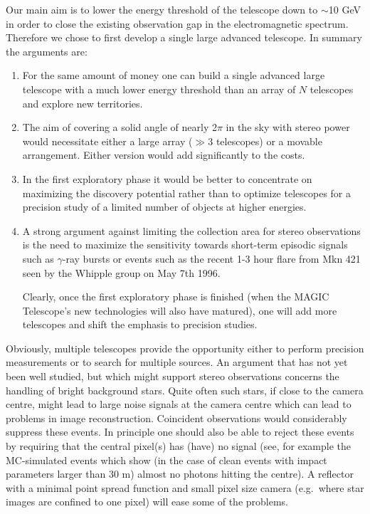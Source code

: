Our main aim is to
lower the energy threshold of the telescope down to $\sim$10 GeV
in order to close the existing observation
gap in the electromagnetic spectrum. Therefore we chose to first develop
a single large advanced telescope.
In summary the arguments are:

\begin{enumerate}
\item  For the same amount of money one can build a single advanced large telescope with a
much lower energy threshold than an array of $N$ telescopes and
explore new territories.

\item  The aim of covering a solid angle of nearly 2$\pi $ in the
sky with stereo
power would necessitate either a large array ($\gg $3 telescopes) or a
movable arrangement. Either version would add significantly to the costs.

\item  In the first exploratory phase it would be better to concentrate on
maximizing the discovery potential rather than to optimize telescopes for a
precision study of a limited number of objects at higher energies.

\item  A strong argument against limiting the collection area for stereo
observations is the need to maximize the sensitivity towards short-term
episodic signals such as $\gamma $-ray bursts or events such as the recent
1-3 hour flare from Mkn 421 seen by the Whipple group on May 7th 1996.

Clearly, once the first exploratory phase is finished (when the MAGIC 
Telescope's new
technologies will also have matured), one will add more telescopes and shift
the emphasis to precision studies.
\end{enumerate}

Obviously, multiple telescopes provide the opportunity either to perform
precision measurements or to search for multiple sources. An argument that
has not yet been well studied, but which might support stereo observations
concerns  the handling of bright background stars. Quite often 
such stars, if close to the camera centre, might lead to
large noise signals at the camera centre which 
can lead to problems 
in image reconstruction.
Coincident observations would
considerably suppress these events. In principle one should also be able to
reject these events by requiring that the central  pixel(s) has (have) no
signal (see, for example the MC-simulated events which show (in the case of 
clean events with impact
parameters larger than 30 m) almost no photons hitting the
centre). A reflector with a minimal point spread function and small pixel size
camera
(e.g.\ where star images are confined to one pixel) will ease some of the
problems.

